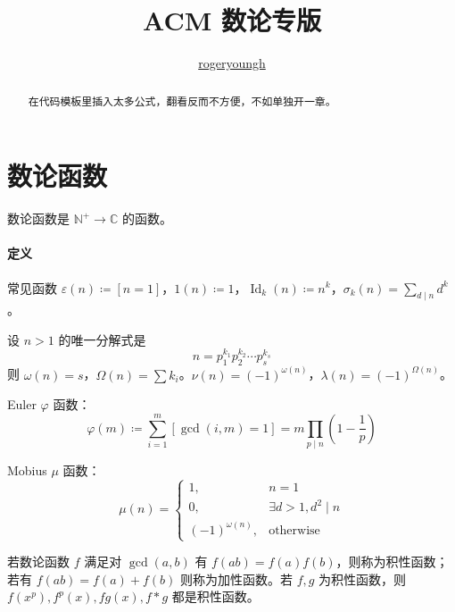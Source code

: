 \documentclass{pureart}
\title{ACM 数论专版}
\author{\href{https://github.com/rogeryoungh}{rogeryoungh}}
\begin{document}
\newcommand\mfrac[2]{\dfrac{#1\smash[b]{\strut}}{#2\smash[t]{\strut}}}
\newcommand{\RR}{\mathbb{R}}
\newcommand{\NN}{\mathbb{N}}
\newcommand{\QQ}{\mathbb{Q}}
\newcommand{\ZZ}{\mathbb{Z}}
\newcommand{\PP}{\mathbb{P}}
\newcommand{\ee}{\mathrm{e}}
\newcommand{\dd}{\mathrm{d}}
\newcommand{\uppi}{\mathrm{\pi}}
\newcommand{\eps}{\varepsilon}

\newcommand{\lcm}{\operatorname{lcm}}
\newcommand{\DFT}{\operatorname{DFT}_{\omega_n}}
\newcommand{\Id}{\operatorname{Id}}

\newcommand{\num}[1]{{\fzfs{（}}{\rm{#1}}{\fzfs{）}}}

\maketitle

\tableofcontents

\begin{abstract}
    在代码模板里插入太多公式，翻看反而不方便，不如单独开一章。
\end{abstract}

\section{数论函数}

数论函数是 $\mathbb{N}^+ \to \mathbb{C}$ 的函数。

\paragraph{定义}
常见函数 $\varepsilon(n) \coloneqq [n=1]$，$1(n) \coloneqq 1$，$\Id_k(n) \coloneqq n^k$，$\sigma_k(n) = \sum\limits_{d \mid n} d^k$。

设 $n > 1$ 的唯一分解式是
\[ n = p_1^{k_1}p_2^{k_2}\cdots p_s^{k_s} \]
则 $\omega(n) = s$，$\Omega(n) = \sum k_i$。$\nu(n) = (-1)^{\omega(n)}$，$\lambda(n) = (-1)^{\Omega(n)}$。

Euler $\varphi$ 函数：
\[ \varphi(m) \coloneqq \sum_{i=1}^m [\gcd(i,m) = 1] = m \prod_{p \mid n}\left( 1-\frac{1}{p} \right) \]

Mobius $\mu$ 函数：
\[ \mu(n) = \begin{cases}
    1, &n=1\\
    0, &\exists d > 1, d^2 \mid n\\
    (-1)^{\omega(n)}, &\text{otherwise}
\end{cases} \]

若数论函数 $f$ 满足对 $\gcd(a,b)$ 有 $f(ab) = f(a)f(b)$，则称为积性函数；若有 $f(ab) = f(a) + f(b)$ 则称为加性函数。若 $f,g$ 为积性函数，则 $f(x^p),f^p(x),fg(x),f \ast g$ 都是积性函数。
\end{document}
